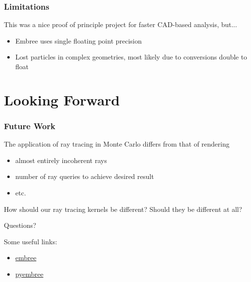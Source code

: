 \documentclass[12pt]{beamer}
\begin{document}
\begin{frame}
\frametitle{Limitations}

This was a nice proof of principle project for faster CAD-based analysis, but... \\
\vfill
\begin{itemize}
\item Embree uses single floating point precision
\item Lost particles in complex geometries, most likely due to conversions double to float
\end{itemize}
\end{frame}

\section{Looking Forward} %

\begin{frame}

\frametitle{Future Work}

\vfill
The application of ray tracing in Monte Carlo differs from that of rendering
  \begin{itemize}
    \item almost entirely incoherent rays
    \item number of ray queries to achieve desired result
    \item etc.
  \end{itemize}
\vfill
How should our ray tracing kernels be different? Should they be different at all?

\end{frame}

\begin{frame}

\begin{center}
\vfill
\huge {Questions?}
\vfill
\end{center}
\normalsize
Some useful links:
\begin{itemize}
\item \href{https://embree.github.io/}{{\color{blue}embree}}
\item \href{https://github.com/scopatz/pyembree}{{\color{blue}pyembree}}
\end{itemize}

\end{frame}
\end{document}
